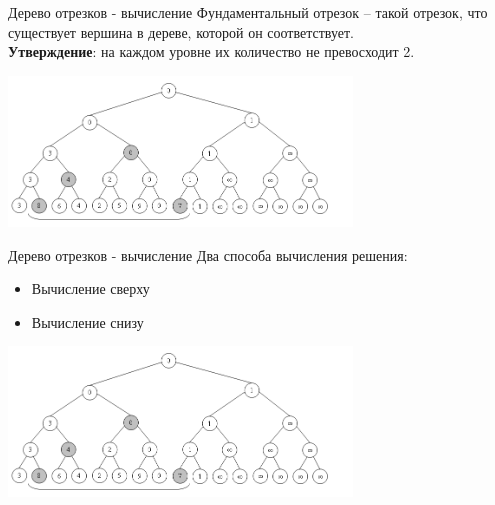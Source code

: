 \documentclass[10pt]{beamer}
\begin{document}
\begin{frame}[fragile]{Дерево отрезков - вычисление}
Фундаментальный отрезок -- такой отрезок, что существует вершина в дереве, которой он соответствует. \\
\textbf{Утверждение}: на каждом уровне их количество не превосходит 2. 
\begin{center}
    \includegraphics[height=4cm]{Term_2/Source/images/9-segment-tree-1.png}
\end{center}
\end{frame}

\begin{frame}[fragile]{Дерево отрезков - вычисление}
Два способа вычисления решения:
\begin{itemize}
    \item Вычисление сверху
    \item Вычисление снизу
\end{itemize}
\begin{center}
    \includegraphics[height=4cm]{Term_2/Source/images/9-segment-tree-1.png}
\end{center}
\end{frame}
\end{document}

